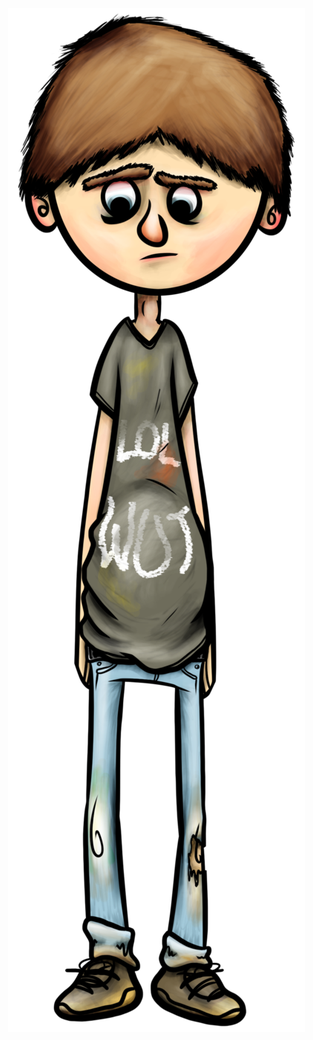 \begin{figure}[H]
\begin{subfigure}{.11\textwidth}
    \includegraphics[width=.9\linewidth]{images/ref_SEAN02}

\end{subfigure}
\end{figure}
